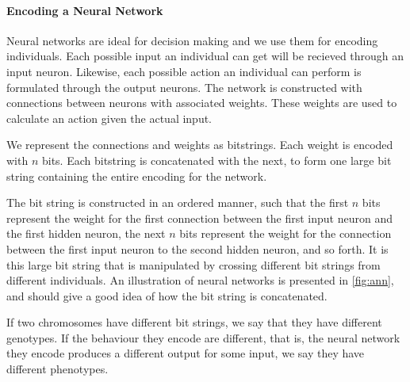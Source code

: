 \paragraph{Encoding a Neural Network}


Neural networks are ideal for decision making and we use them for encoding individuals. Each possible input an individual can get will be recieved through an input neuron. Likewise, each possible action an individual can perform is formulated through the output neurons. The network is constructed with connections between neurons with associated weights. These weights are used to calculate an action given the actual input.

We represent the connections and weights as bitstrings. Each weight is encoded with $n$ bits. Each bitstring is concatenated with the next, to form one large bit string containing the entire encoding for the network.

The bit string is constructed in an ordered manner, such that the first $n$ bits represent the weight for the first connection between the first input neuron and the first hidden neuron, the next $n$ bits represent the weight for the connection between the first input neuron to the second hidden neuron, and so forth. It is this large bit string that is manipulated by crossing different bit strings from different individuals. An illustration of neural networks is presented in \cref{fig:ann}, and should give a good idea of how the bit string is concatenated.




If two chromosomes have different bit strings, we say that they have different genotypes. If the behaviour they encode are different, that is, the neural network they encode produces a different output for some input,  we say they have different phenotypes.

